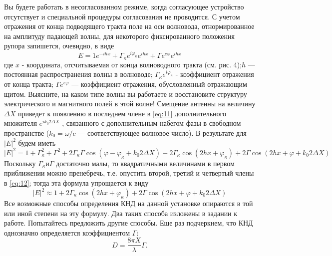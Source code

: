 Вы будете работать в несогласованном режиме, когда согласующее устройство отсутствует и специальной процедуры 
согласования не проводится. С учетом отражения от конца подводящего тракта поле на оси волновода, отнормированное на 
амплитуду падающей волны, для некоторого фиксированного положения рупора запишется, очевидно, в виде
\begin{equation}
    E = 1e^{-ihx}+\Gamma_\kappa e^{i\varphi_\kappa} e^{ihx}+ \Gamma e^{e\varphi} e^{ihx}
    \label{eq:11}
\end{equation}
где $x$ - координата, отсчитываемая от конца волноводного тракта (см. рис. 4);$h$ — постоянная распространения волны в 
волноводе; $\Gamma_\kappa e^{i\varphi_\kappa}$ - коэффициент отражения от конца тракта; $\Gamma e^{e\varphi}$ — коэффициент 
отражения, обусловленный отражающим щитом. Выясните, на каком типе волны вы работаете и восстановите структуру 
электрического и магнитного полей в этой волне! Смещение антенны на величину $\Delta X$ приведет к появлению в последнем члене 
в \ref{eq:11} дополнительного множителя $ e^{ i k_0 2\Delta X } $ , связанного с дополнительным набегом фазы в свободном пространстве
($k_0=\omega/c$ — соответствующее волновое число). В результате для $ |E|^2 $ будем иметь
\begin{equation}
    |E|^{2} =1+\Gamma_{\kappa}^{2}+\Gamma^{2}+2 \Gamma_{\kappa} \Gamma \cos {(\varphi-\varphi_{\kappa}+k_{0} 2 \Delta X)} + 2 \Gamma_{\kappa} \cos{(2 h x+\varphi_{\kappa})}+2 \Gamma \cos{(2 h x+\varphi+k_{0} 2 \Delta X)}
    \label{eq:12}
\end{equation}
Поскольку $ \Gamma_{\kappa} \text{и} \Gamma$ достаточно малы, то квадратичными величинами в первом приближении можно 
пренебречь, т.е. опустить второй, третий и четвертый члены в \ref{eq:12}; тогда эта формула упрощается к виду
\begin{equation}
    |E|^{2} \approx 1+2 \Gamma_{\kappa} \cos \left(2 h x+\varphi_{\kappa}\right)+2 \Gamma \cos \left(2 h x+\varphi+k_{0} 2 \Delta X\right)
    \label{eq:13}
\end{equation}
Все возможные способы определения КНД на данной установке опираются в той или иной степени на эту формулу. Два таких 
способа изложены в задании к работе. Попытайтесь предложить другие способы. Еще раз подчеркнем, что КНД однозначно 
определяется коэффициентом $\Gamma$:
\begin{equation}
    D = \frac{8 \pi X}{\lambda} \Gamma.
    \label{eq:14}
\end{equation}

